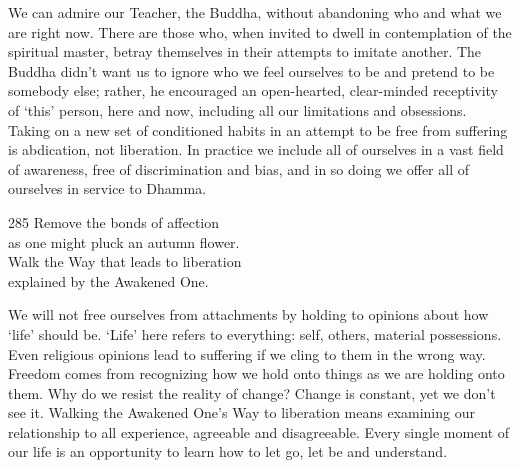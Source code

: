 \begin{dhpRefl}
  We can admire our Teacher, the Buddha, without abandoning who and what we are
  right now. There are those who, when invited to dwell in contemplation of the
  spiritual master, betray themselves in their attempts to imitate another. The
  Buddha didn’t want us to ignore who we feel ourselves to be and pretend to be
  somebody else; rather, he encouraged an open-hearted, clear-minded receptivity
  of ‘this’ person, here and now, including all our limitations and obsessions.
  Taking on a new set of conditioned habits in an attempt to be free from
  suffering is abdication, not liberation. In practice we include all of
  ourselves in a vast field of awareness, free of discrimination and bias, and
  in so doing we offer all of ourselves in service to Dhamma.
\end{dhpRefl}


\begin{dhpVerse}{285}
\label{dhp-285}
Remove the bonds of affection\\
as one might pluck an autumn flower.\\
Walk the Way that leads to liberation\\
explained by the Awakened One.
\end{dhpVerse}

\begin{dhpRefl}
  We will not free ourselves from attachments by holding to opinions about how
  `life' should be. `Life' here refers to everything: self, others, material
  possessions. Even religious opinions lead to suffering if we cling to them in
  the wrong way. Freedom comes from recognizing how we hold onto things as we
  are holding onto them. Why do we resist the reality of change? Change is
  constant, yet we don’t see it. Walking the Awakened One’s Way to liberation
  means examining our relationship to all experience, agreeable and
  disagreeable. Every single moment of our life is an opportunity to learn how
  to let go, let be and understand.
\end{dhpRefl}

